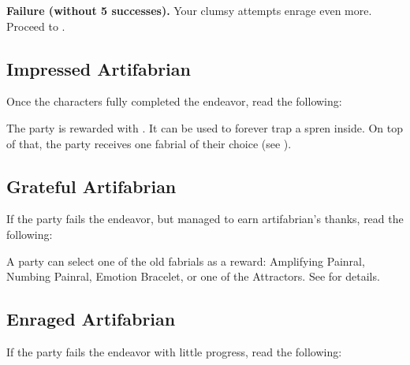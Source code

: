 \textbf{Failure (without 5 successes).} Your clumsy attempts enrage \npcArtifabrian{} even more. Proceed to .


\subsection{Impressed Artifabrian}
\label{ssec:artifabrianImpressed}

Once the characters fully completed the endeavor, read the following:


The party is rewarded with \lootPerfectGemstone{}. It can be used to forever trap a spren inside. On top of that, the party receives one fabrial of their choice (see ).

\subsection{Grateful Artifabrian}
\label{ssec:artifabrianGrateful}

If the party fails the endeavor, but managed to earn artifabrian's thanks, read the following:


A party can select one of the old fabrials as a reward: Amplifying Painral, Numbing Painral, Emotion Bracelet, or one of the Attractors. See \handbook{} for details.

\subsection{Enraged Artifabrian}
\label{ssec:artifabrianAngry}

If the party fails the endeavor with little progress, read the following:

